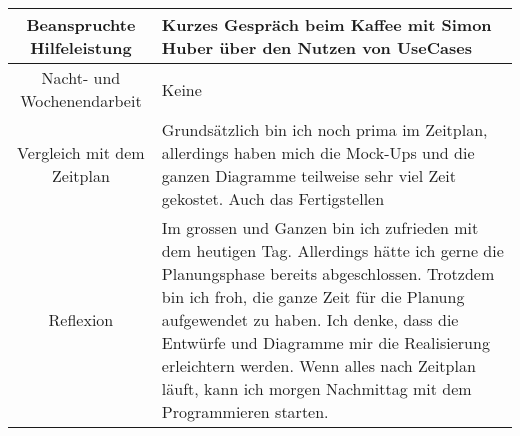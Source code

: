 \begin{tabularx}{\textwidth}[H]{|c|X|}
    Beanspruchte Hilfeleistung &
    Kurzes Gespräch beim Kaffee mit Simon Huber über den Nutzen von UseCases
    \\ \hline

    Nacht- und Wochenendarbeit &
    Keine
    \\ \hline

    Vergleich mit dem Zeitplan &
    Grundsätzlich bin ich noch prima im Zeitplan, allerdings haben mich die Mock-Ups und die ganzen Diagramme teilweise
    sehr viel Zeit gekostet. Auch das Fertigstellen
    \\ \hline

    Reflexion                  &
    Im grossen und Ganzen bin ich zufrieden mit dem heutigen Tag. Allerdings hätte ich gerne die Planungsphase bereits abgeschlossen.
    Trotzdem bin ich froh, die ganze Zeit für die Planung aufgewendet zu haben. Ich denke,
    dass die Entwürfe und Diagramme mir die Realisierung erleichtern werden. Wenn alles nach Zeitplan läuft,
    kann ich morgen Nachmittag mit dem Programmieren starten.
    \\ \hline
\end{tabularx}
